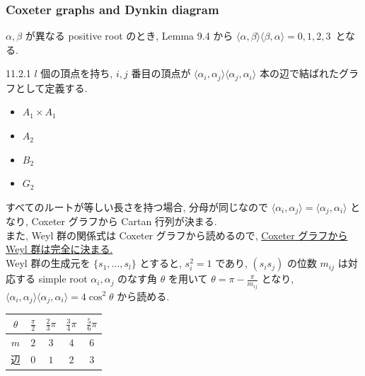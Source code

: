 \documentclass[uplatex,dvipdfmx]{jsarticle}
\begin{document}
\subsubsection{Coxeter graphs and Dynkin diagram}
$\alpha, \beta$ が異なる positive root のとき, Lemma 9.4 から $\langle \alpha, \beta \rangle \langle \beta, \alpha \rangle = 0, 1, 2, 3$~となる.\\
\begin{mydef}{11.2.1}
    $l$ 個の頂点を持ち, $i, j$ 番目の頂点が $\langle \alpha_i, \alpha_j \rangle \langle \alpha_j, \alpha_i \rangle$ 本の辺で結ばれたグラフとして定義する.
\end{mydef}
\begin{itemize}
    \item $A_1 \times A_1$ \quad 
    \item $A_2$ \quad 
    \item $B_2$ \quad 
    \item $G_2$ \quad 
\end{itemize}
すべてのルートが等しい長さを持つ場合, 分母が同じなので $\langle \alpha_i, \alpha_j \rangle = \langle \alpha_j, \alpha_i \rangle$ となり, Coxeter グラフから Cartan 行列が決まる.\\
また, Weyl 群の関係式は Coxeter グラフから読めるので, \underline{Coxeter グラフから Weyl 群は完全に決まる.}\\
Weyl 群の生成元を $\{s_1, \dots, s_l\}$ とすると, $s_i^2 = 1$ であり, $(s_i s_j)$ の位数 $m_{ij}$ は対応する simple root $\alpha_i, \alpha_j$ のなす角 $\theta$ を用いて $\theta = \pi - \frac{\pi}{m_{ij}}$ となり, $\langle \alpha_i, \alpha_j \rangle \langle \alpha_j, \alpha_i \rangle = 4 \cos^2 \theta$ から読める.\\
\begin{table}[h]
\centering
\begin{tabular}{|c|c|c|c|c|}
\hline
$\theta$ & $\frac{\pi}{2}$ & $\frac{2}{3}\pi$ & $\frac{3}{4}\pi$ & $\frac{5}{6}\pi$ \\ \hline
$m$ & $2$ & $3$ & $4$ & $6$ \\ \hline
辺 & $0$ & $1$ & $2$ & $3$ \\ \hline
\end{tabular}
\end{table}
\end{document}
